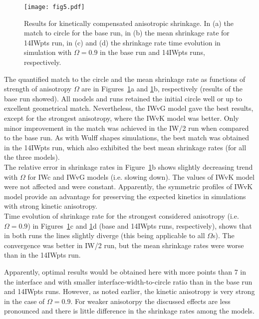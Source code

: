 \begin{figure}[]
	\centering
	\texttt{[image: fig5.pdf]}
	\caption[Results for kinetically compensated anisotropic shrinkage]{Results for kinetically compensated anisotropic shrinkage. In (a) the match to circle for the base run, in (b) the mean shrinkage rate for 14IWpts run, in (c) and (d) the shrinkage rate time evolution in simulation with $\Omega=0.9$ in the base run and 14IWpts runs, respectively.}
	\label{fig_companiso}
\end{figure}

The quantified match to the circle and the mean shrinkage rate as functions of strength of anisotropy $\Omega$ are in Figures~\ref{fig_companiso}a and \ref{fig_companiso}b, respectively (results of the base run showed). All models and runs retained the initial circle well or up to excellent geometrical match. Nevertheless, the IWvG model gave the best results, except for the strongest anisotropy, where the IWvK model was better. Only minor improvement in the match was achieved in the IW/2 run when compared to the base run. As with Wulff shapes simulations, the best match was obtained in the 14IWpts run, which also exhibited the best mean shrinkage rates (for all the three models). \\
The relative error in shrinkage rates in Figure~\ref{fig_companiso}b shows slightly decreasing trend with $\Omega$ for IWc and IWvG models (i.e. slowing down). The values of IWvK model were not affected and were constant. Apparently, the symmetric profiles of IWvK model provide an advantage for preserving the expected kinetics in simulations with strong kinetic anisotropy.\\
Time evolution of shrinkage rate for the strongest considered anisotropy (i.e. $\Omega=0.9$) in Figures~\ref{fig_companiso}c and \ref{fig_companiso}d (base and 14IWpts runs, respectively), shows that in both runs the lines slightly diverge (this being applicable to all $\Omega$s). The convergence was better in IW/2 run, but the mean shrinkage rates were worse than in the 14IWpts run.

Apparently, optimal results would be obtained here with more points than 7 in the interface and with smaller interface-width-to-circle ratio than in the base run and 14IWpts runs. However, as noted earlier, the kinetic anisotropy is very strong in the case of $\Omega=0.9$. For weaker anisotorpy the discussed effects are less pronounced and there is little difference in the shrinkage rates among the models.

